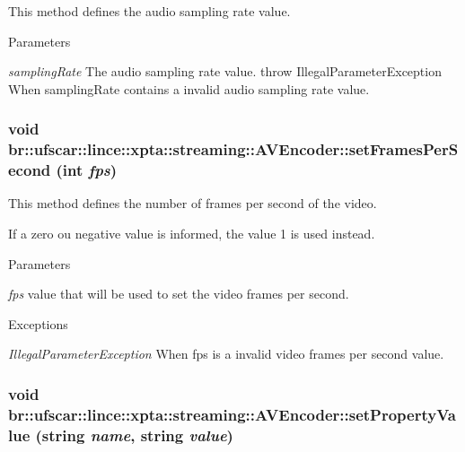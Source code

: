 This method defines the audio sampling rate value. 


\begin{DoxyParams}{Parameters}
\item[{\em samplingRate}]The audio sampling rate value. throw IllegalParameterException When samplingRate contains a invalid audio sampling rate value. \end{DoxyParams}
\hypertarget{classbr_1_1ufscar_1_1lince_1_1xpta_1_1streaming_1_1AVEncoder_a942b6dc55d94adb7df4531cd04794552}{
\subsubsection[{setFramesPerSecond}]{\setlength{\rightskip}{0pt plus 5cm}void br::ufscar::lince::xpta::streaming::AVEncoder::setFramesPerSecond (int {\em fps})}}
\label{classbr_1_1ufscar_1_1lince_1_1xpta_1_1streaming_1_1AVEncoder_a942b6dc55d94adb7df4531cd04794552}


This method defines the number of frames per second of the video. 

If a zero ou negative value is informed, the value 1 is used instead. 
\begin{DoxyParams}{Parameters}
\item[{\em fps}]value that will be used to set the video frames per second. \end{DoxyParams}

\begin{DoxyExceptions}{Exceptions}
\item[{\em IllegalParameterException}]When fps is a invalid video frames per second value. \end{DoxyExceptions}
\hypertarget{classbr_1_1ufscar_1_1lince_1_1xpta_1_1streaming_1_1AVEncoder_a9a623b8b8e47be5d61c47bf125f16483}{
\subsubsection[{setPropertyValue}]{\setlength{\rightskip}{0pt plus 5cm}void br::ufscar::lince::xpta::streaming::AVEncoder::setPropertyValue (string {\em name}, \/  string {\em value})}}
\label{classbr_1_1ufscar_1_1lince_1_1xpta_1_1streaming_1_1AVEncoder_a9a623b8b8e47be5d61c47bf125f16483}


